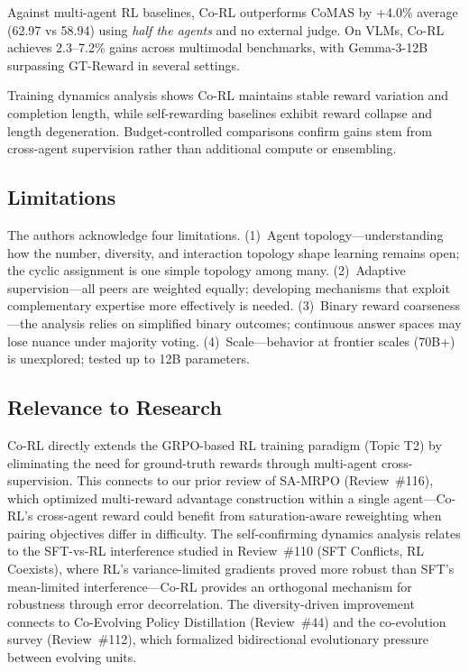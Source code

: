 \documentclass[11pt,a4paper]{article}
\begin{document}
Against multi-agent RL baselines, Co-RL outperforms CoMAS by +4.0\% average (62.97 vs 58.94) using \emph{half the agents} and no external judge. On VLMs, Co-RL achieves 2.3--7.2\% gains across multimodal benchmarks, with Gemma-3-12B surpassing GT-Reward in several settings.

Training dynamics analysis shows Co-RL maintains stable reward variation and completion length, while self-rewarding baselines exhibit reward collapse and length degeneration. Budget-controlled comparisons confirm gains stem from cross-agent supervision rather than additional compute or ensembling.

\subsection{Limitations}
The authors acknowledge four limitations. (1)~Agent topology---understanding how the number, diversity, and interaction topology shape learning remains open; the cyclic assignment is one simple topology among many. (2)~Adaptive supervision---all peers are weighted equally; developing mechanisms that exploit complementary expertise more effectively is needed. (3)~Binary reward coarseness---the analysis relies on simplified binary outcomes; continuous answer spaces may lose nuance under majority voting. (4)~Scale---behavior at frontier scales (70B+) is unexplored; tested up to 12B parameters.

\subsection{Relevance to Research}
Co-RL directly extends the GRPO-based RL training paradigm (Topic T2) by eliminating the need for ground-truth rewards through multi-agent cross-supervision. This connects to our prior review of SA-MRPO (Review~\#116), which optimized multi-reward advantage construction within a single agent---Co-RL's cross-agent reward could benefit from saturation-aware reweighting when pairing objectives differ in difficulty. The self-confirming dynamics analysis relates to the SFT-vs-RL interference studied in Review~\#110 (SFT Conflicts, RL Coexists), where RL's variance-limited gradients proved more robust than SFT's mean-limited interference---Co-RL provides an orthogonal mechanism for robustness through error decorrelation. The diversity-driven improvement connects to Co-Evolving Policy Distillation (Review~\#44) and the co-evolution survey (Review~\#112), which formalized bidirectional evolutionary pressure between evolving units.
\end{document}
